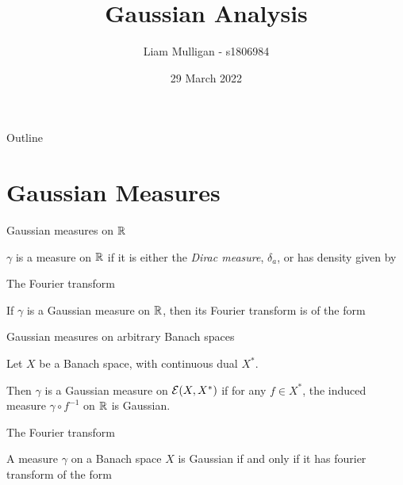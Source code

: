 \documentclass{beamer}
\title{Gaussian Analysis}
\author{Liam Mulligan - s1806984}
\institute{The University of Edinburgh}
\date{29 March 2022}
\begin{document}
\begin{frame}
\titlepage
\end{frame}

\begin{frame}{Outline}
\tableofcontents
\end{frame}

\section{Gaussian Measures}
\begin{frame}{Gaussian measures on \texorpdfstring{$\operatorname{\mathbb{R}}$}{R}}
    \begin{definition}
    $\gamma$ is a  measure on $\operatorname{\mathbb{R}}$ if it is either the \emph{Dirac measure}, $\delta_a$, or has density given by 
    \end{definition}
\end{frame}
\begin{frame}{The Fourier transform}
    \begin{proposition}
    If $\gamma$ is a Gaussian measure on $\operatorname{\mathbb{R}}$, then its Fourier transform is of the form 
    \end{proposition}    
\end{frame}
\begin{frame}{Gaussian measures on arbitrary Banach spaces}
    \begin{definition}
    Let $X$ be a Banach space, with continuous dual $X^*$. 
    
    Then $\gamma$ is a Gaussian measure on $\mathcal{E}(X,X^*)$ if for any $f\in X^*$, the induced measure $\gamma\circ f^{-1}$ on $\operatorname{\mathbb{R}}$ is Gaussian.
    \end{definition}
\end{frame}
\begin{frame}{The Fourier transform}
    \begin{theorem}
    A measure $\gamma$ on a Banach space $X$ is Gaussian if and only if it has fourier transform of the form 
    \end{theorem}
\end{frame}
\end{document}
